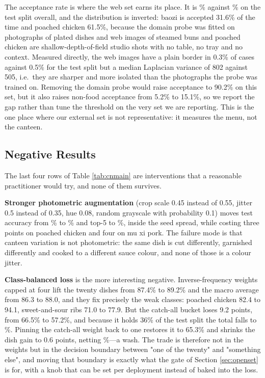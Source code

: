 The acceptance rate is where the web set earns its place. It is \webAccept\%
against \gateIn\% on the test split overall, and the distribution is inverted:
baozi is
accepted 31.6\% of the time and poached chicken 61.5\%, because the domain probe
was fitted on photographs of plated dishes and web images of steamed buns and
poached chicken are shallow-depth-of-field studio shots with no table, no tray
and no context. Measured directly, the web images have a plain border in 0.3\%
of cases against 0.5\% for the test split but a median Laplacian variance of 802
against 505, i.e.\ they are sharper and more isolated than the photographs the
probe was trained on. Removing the domain probe would raise acceptance to 90.2\%
on this set, but it also raises non-food acceptance from 5.2\% to 15.1\%, so we
report the gap rather than tune the threshold on the very set we are reporting.
This is the one place where our external set is not representative: it measures
the menu, not the canteen.

\subsection{Negative Results}
The last four rows of Table \ref{tab:cnmain} are interventions that a reasonable
practitioner would try, and none of them survives.

\textbf{Stronger photometric augmentation} (crop scale 0.45 instead of 0.55,
jitter 0.5 instead of 0.35, hue 0.08, random grayscale with probability 0.1)
moves test accuracy from \cnTest\% to \ablStrongTest\% and top-5 to
\ablStrongTopFive\%, inside the seed spread, while costing three points on
poached chicken and four on mu xi pork. The failure mode is that canteen
variation is not photometric: the same dish is cut differently, garnished
differently and cooked to a different sauce colour, and none of those is a
colour jitter.

\textbf{Class-balanced loss} is the more interesting negative. Inverse-frequency
weights capped at four lift the twenty dishes from 87.4\% to 89.2\% and the macro
average from 86.3 to 88.0, and they fix precisely the weak classes: poached
chicken 82.4 to 94.1, sweet-and-sour ribs 71.0 to 77.9. But the catch-all bucket
loses 9.2 points, from 66.5\% to 57.2\%, and because it holds 36\% of the test
split the total falls to \ablBalTest\%. Pinning the catch-all weight back to one
restores it to 65.3\% and shrinks the dish gain to 0.6 points, netting
\ablBalNoOtherTest\%---a wash. The trade is therefore not in the weights but in
the decision boundary between "one of the twenty" and "something else", and
moving that boundary is exactly what the gate of Section \ref{sec:openset} is
for, with a knob that can be set per deployment instead of baked into the loss.

